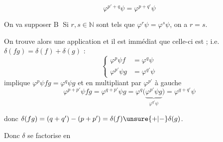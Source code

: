 
\[
\varphi^{p'+q}\psi=\varphi^{p+q'}\psi
\]

On va supposer
\textcircled{B} Si $r,s\in\mathbb N$ sont tels que $\varphi^r\psi=\varphi^s\psi$, on a $r=s$.

On trouve alors une application
et il est immédiat que celle-ci est  ; i.e. $\delta(fg)=\delta(f)+\delta(g)$ :
\[
\left\{\begin{aligned}\varphi^p\psi f&=\varphi^q\psi\\ \varphi^{p'}\psi g&=\varphi^{q'}\psi\end{aligned}\right.
\]
implique $\varphi^p\psi fg=\varphi^q\psi g$
et en multipliant par $\varphi^{p'}$ à gauche
\[
\varphi^{p+p'}\psi fg=\varphi^{q+p'}\psi g=\varphi^q\bigl(\underbrace{\varphi^{p'}\psi g}_{\varphi^{q'}\psi}\bigr)=\varphi^{q+q'}\psi
\]

donc $\delta(fg)=(q+q')-(p+p')=\delta(f)\unsure{+|-}\delta(g)$.

Donc $\delta$ se factorise en

